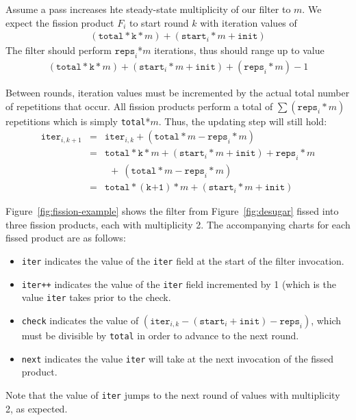 Assume a pass increases hte steady-state multiplicity of our filter to $m$.  We expect the fission product $F_i$ to start round $k$ with iteration values of 
\begin{eqnarray*}
(\texttt{total}*\texttt{k}*m) + (\texttt{start}_i*m + \texttt{init})
\end{eqnarray*}
The filter should perform $\texttt{reps}_i$*$m$ iterations, thus should range up to value
\begin{eqnarray*}
(\texttt{total}*\texttt{k}*m) + (\texttt{start}_i*m + \texttt{init}) + (\texttt{reps}_i*m) - 1
\end{eqnarray*}

Between rounds, iteration values must be incremented by the actual total number of repetitions that occur.  All fission products perform a total of $\sum(\texttt{reps}_{i}*m)$ repetitions which is simply \texttt{total}*$m$.  Thus, the updating step will still hold:
\begin{eqnarray*}
\texttt{iter}_{i,k+1} &=& \texttt{iter}_{i,k} + (\texttt{total}*m - \texttt{reps}_i*m) \\
&=& \texttt{total}*\texttt{k}*m + (\texttt{start}_i*m + \texttt{init}) + \texttt{reps}_i*m \\
&&  \ \ +\ (\texttt{total}*m - \texttt{reps}_i*m) \\
&=& \texttt{total}*(\texttt{k+1})*m + (\texttt{start}_i*m + \texttt{init})
\end{eqnarray*}

Figure~\ref{fig:fission-example} shows the filter from Figure~\ref{fig:desugar} fissed into three fission products, each with multiplicity 2.  The accompanying charts for each fissed product are as follows:
\begin{itemize}
\item{\tt iter} indicates the value of the {\tt iter} field at the start of the filter invocation.  
\item{\tt iter++} indicates the value of the {\tt iter} field incremented by 1 (which is the value {\tt iter} takes prior to the check.  
\item{\tt check} indicates the value of $(\texttt{iter}_{i,k} - (\texttt{start}_i + \texttt{init}) - \texttt{reps}_i)$, which must be divisible by {\tt total} in order to advance to the next round.  
\item{\tt next} indicates the value {\tt iter} will take at the next invocation of the fissed product.
\end{itemize}
Note that the value of \texttt{iter} jumps to the next round of values with multiplicity 2, as expected.
